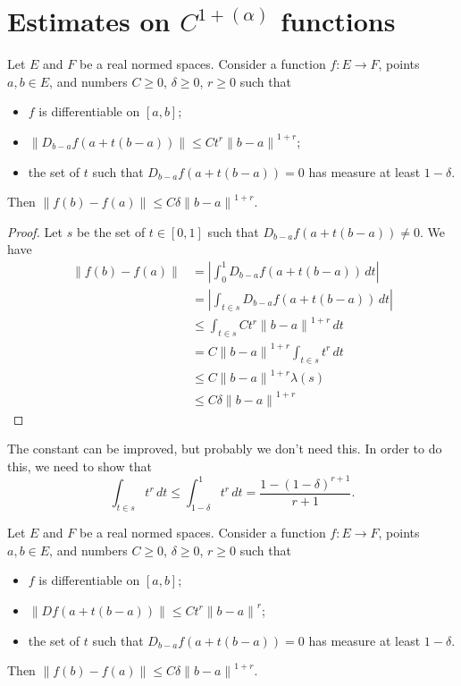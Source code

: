 \section{Estimates on \texorpdfstring{\(C^{1+(\alpha)}\)}{C\^(1+α)} functions}

\begin{lemma}%
  \label{lem:cdh-at-sub-affine-le-of-meas}
  Let \(E\) and \(F\) be a real normed spaces.
  Consider a function \(f\colon E\to F\), points \(a, b \in E\),
  and numbers \(C\ge 0\), \(\delta\ge 0\), \(r \ge 0\) such that
  \begin{itemize}
  \item \(f\) is differentiable on \([a, b]\);
  \item \(\|D_{b - a}f(a + t(b - a))\| \le Ct^{r}{\|b - a\|}^{1+r}\);
  \item the set of \(t\) such that \(D_{b - a}f(a + t(b - a)) = 0\)
    has measure at least \(1 - \delta\).
  \end{itemize}
  Then \(\|f(b) - f(a)\| \le C\delta{\|b - a\|}^{1+r}\).
\end{lemma}

\begin{proof}
  Let \(s\) be the set of \(t \in [0, 1]\) such that \(D_{b - a}f(a + t(b - a)) \ne 0\).
  We have
  \begin{align*}
    \|f(b) - f(a)\| &= \left|\int_{0}^{1} D_{b - a}f(a + t(b - a))\,dt\right| \\
                    &= \left|\int_{t\in s} D_{b - a}f(a + t(b - a))\,dt\right| \\
                    &\le \int_{t \in s} Ct^{r}{\|b - a\|}^{1+r}\,dt \\
                    &= C{\|b - a\|}^{1+r} \int_{t \in s}t^{r}\,dt \\
                    &\le C{\|b - a\|}^{1+r} \lambda(s) \\
                    &\le C\delta {\|b - a\|}^{1+r}
  \end{align*}
\end{proof}

\begin{remark}
  The constant can be improved, but probably we don't need this.
  In order to do this, we need to show that
  \[
    \int_{t \in s}t^{r}\,dt \le \int_{1 - \delta}^{1} t^{r}\,dt = \frac{1 - {(1 - \delta)}^{r + 1}}{r + 1}.
  \]
\end{remark}

\begin{corollary}%
  \label{cor:cdh-at-sub-le-of-meas-fderiv}
  Let \(E\) and \(F\) be a real normed spaces.
  Consider a function \(f\colon E\to F\), points \(a, b \in E\),
  and numbers \(C\ge 0\), \(\delta\ge 0\), \(r \ge 0\) such that
  \begin{itemize}
  \item \(f\) is differentiable on \([a, b]\);
  \item \(\|Df(a + t(b - a))\| \le Ct^{r}{\|b - a\|}^r\);
  \item the set of \(t\) such that \(D_{b - a}f(a + t(b - a)) = 0\)
    has measure at least \(1 - \delta\).
  \end{itemize}
  Then \(\|f(b) - f(a)\| \le C\delta{\|b - a\|}^{1+r}\).
\end{corollary}

